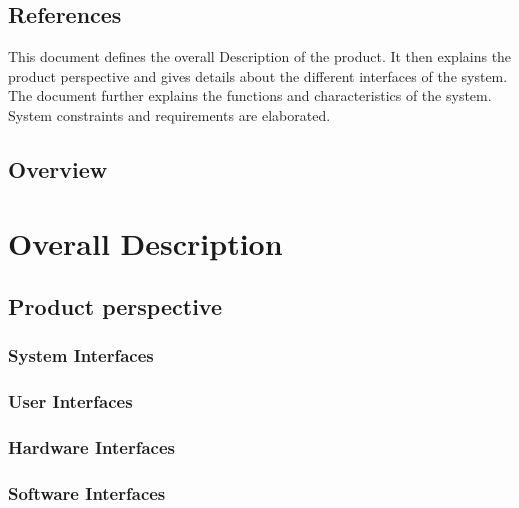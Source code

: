 \documentclass[a4paper,12pt]{article}
\begin{document}
        \subsection{References}
        This document defines the overall Description of the product. It then explains the product perspective and gives details about the different interfaces of the system. The document further explains the functions and characteristics of the system. System constraints and requirements are elaborated.
        \subsection{Overview}
        
    
    \section{Overall Description}
    
    	\subsection{Product perspective}
    	
        	\subsubsection{System Interfaces}
        	
            \subsubsection{User Interfaces}
            
            \subsubsection{Hardware Interfaces}
            
            \subsubsection{Software Interfaces}
            
\end{document}
